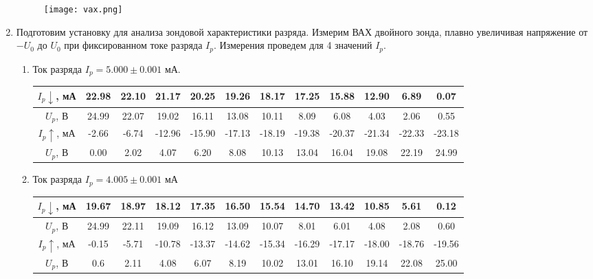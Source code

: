 \documentclass[a4paper, 12pt]{article}
\begin{document}
\begin{enumerate}
\begin{figure}[htbp]
        \texttt{[image: vax.png]}
    \end{figure}
    \item Подготовим установку для анализа зондовой характеристики разряда. Измерим ВАХ двойного зонда, плавно увеличивая напряжение
    от $-U_{0}$ до $U_{0}$ при фиксированном токе разряда $I_{p}$. Измерения проведем для 4 значений $I_{p}$.
    \begin{enumerate}
        \item Ток разряда $I_{p} = 5.000\pm 0.001$ мА.
        \begin{table}[htbp]
            \centering
            \begin{tabular}{|c|c|c|c|c|c|c|c|c|c|c|c|}
                \hline
                $I_{p}\downarrow$, мА & 22.98 & 22.10 & 21.17 & 20.25 & 19.26 & 18.17 & 17.25 & 15.88 & 12.90 & 6.89 & 0.07\\ \hline
                $U_{p}$, В & 24.99 & 22.07 & 19.02 & 16.11 & 13.08 & 10.11 & 8.09 & 6.08 & 4.03 & 2.06 & 0.55\\ \hline
                $I_{p}\uparrow$, мА & -2.66 & -6.74 & -12.96 & -15.90 & -17.13 & -18.19 & -19.38 & -20.37 & -21.34 & -22.33 & -23.18\\ \hline
                $U_{p}$, В & 0.00 & 2.02 & 4.07 & 6.20 & 8.08 & 10.13 & 13.04 & 16.04 & 19.08 & 22.19 & 24.99\\ \hline
            \end{tabular}
        \end{table}
        \newpage
        \item Ток разряда $I_{p}= 4.005\pm 0.001$ мА
        \begin{table}[htbp]
            \centering
            \begin{tabular}{|c|c|c|c|c|c|c|c|c|c|c|c|}
                \hline
                $I_{p}\downarrow$, мА & 19.67 & 18.97 & 18.12 & 17.35 & 16.50 & 15.54 & 14.70 & 13.42 & 10.85 & 5.61 & 0.12\\ \hline
                $U_{p}$, В & 24.99 & 22.11 & 19.09 & 16.12 & 13.09 & 10.07 & 8.01 & 6.01 & 4.08 & 2.08 & 0.60\\ \hline
                $I_{p}\uparrow$, мА & -0.15 & -5.71 & -10.78 & -13.37 & -14.62 & -15.34 & -16.29 & -17.17 & -18.00 & -18.76 & -19.56\\ \hline
                $U_{p}$, В & 0.6 & 2.11 & 4.08 & 6.07 & 8.19 & 10.02 & 13.01 & 16.10 & 19.14 & 22.08 & 25.00\\ \hline
            \end{tabular}

\end{table}
\end{enumerate}
\end{enumerate}
\end{document}
